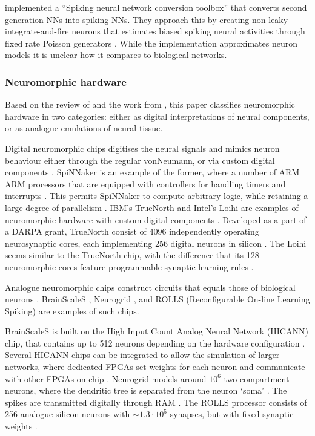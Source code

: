 \documentclass[report.tex]{subfiles}
\begin{document}
\textcite{Rueckauer2017} implemented a ``Spiking neural network conversion
toolbox'' that converts second generation \gls{NN}s into
spiking \gls{NN}s.
They approach this by creating non-leaky integrate-and-fire
 neurons that estimates biased spiking neural activities through
fixed rate Poisson generators
\cite{Rueckauer2017}.
While the implementation approximates neuron models it is unclear
how it compares to biological networks.

\subsubsection{Neuromorphic hardware}
Based on the review of \textcite{Walter2015} and the work from
\cite{Lin2018}, this paper classifies neuromorphic hardware in two
categories: either as digital interpretations of neural components, 
or as analogue emulations of neural tissue.

Digital neuromorphic chips digitises the neural signals and mimics neuron
behaviour either through the regular \gls{vonNeumann}, or
via custom digital components \cite{Walter2015}.
SpiNNaker is an example of the former, where a number of ARM \gls{ARM}
processors that are equipped with controllers for handling timers and
interrupts \cite{Walter2015}.
This permits SpiNNaker to compute arbitrary logic, while retaining
a large degree of parallelism \cite{Albada2018}.
IBM's TrueNorth  and Intel's Loihi 
are examples of neuromorphic hardware with custom digital components 
\cite{Walter2015, Lin2018}.
Developed as a part of a \gls{DARPA} grant, TrueNorth consist of 4096
independently operating neurosynaptic cores, each implementing 256
digital neurons in silicon \cite{Walter2015, ArtificialBrains2018}.
The Loihi seems similar to the TrueNorth chip, with the difference that
its 128 neuromorphic cores feature programmable
synaptic learning rules \cite{Lin2018}.

Analogue neuromorphic chips construct circuits that equals those of biological
neurons \cite{Walter2015}.
BrainScaleS \cite{Schmitt2017}, Neurogrid \cite{BrainsInSilicon2018}, 
and ROLLS (Reconfigurable On-line Learning Spiking)
\cite{Walter2015} are examples of such chips.

BrainScaleS is built on the High Input Count Analog Neural Network (HICANN)
chip, that contains up to 512 neurons depending on the hardware configuration 
\cite{Pfeil2013}.
Several HICANN chips can be integrated to allow the simulation of larger
networks, where dedicated \gls{FPGA}s set weights for each neuron and
communicate with other FPGAs on chip \cite{Walter2015}. 
Neurogrid models around $10^6$ two-compartment neurons, where the dendritic
tree is separated from the neuron `soma' \cite{Walter2015}.
The spikes are transmitted digitally through \gls{RAM} \cite{Walter2015}.
The ROLLS processor consists of 256 analogue silicon neurons with
$\sim1.3 \cdot 10^5$ synapses, but with fixed synaptic weights
\cite{Walter2015}.
\end{document}
